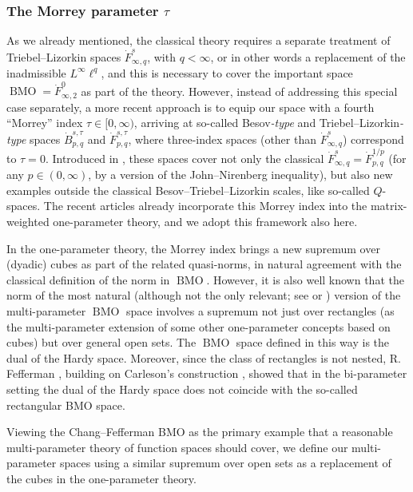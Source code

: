 \documentclass[11pt, reqno]{amsart}
\theoremstyle{definition}
\theoremstyle{remark}
\numberwithin{equation}{section}
\newcommand{\BMO}{\operatorname{BMO}}
\begin{document}
\subsubsection*{The Morrey parameter $\tau$}
As we already mentioned, the classical theory requires a separate treatment of Triebel--Lizorkin spaces $\dot F^s_{\infty,q}$, with $q<\infty$, or in other words a replacement of the inadmissible $L^\infty\ell^q$, and this is necessary to cover the important space $\BMO=\dot F^0_{\infty,2}$ as part of the theory. However, instead of addressing this special case separately, a more recent approach is to equip our space with a fourth ``Morrey'' index $\tau\in[0,\infty)$, arriving at so-called Besov{\em-type} and Triebel--Lizorkin{\em-type} spaces $\dot B^{s,\tau}_{p,q}$ and $\dot F^{s,\tau}_{p,q}$, where three-index spaces (other than $\dot F^s_{\infty,q}$) correspond to $\tau=0$. Introduced in \cite{YY08,YY10,YSY10}, these spaces cover not only the classical $\dot F^s_{\infty,q}=\dot F^{1/p}_{p,q}$ (for any $p\in(0,\infty)$, by a version of the John--Nirenberg inequality), but also new examples outside the classical Besov--Triebel--Lizorkin scales, like so-called $Q$-spaces. The recent articles \cite{BHYY:1a,BHYY:1b,BHYY:1c} already incorporate this Morrey index into the matrix-weighted one-parameter
theory, and we adopt this framework also here.

In the one-parameter theory, the Morrey index brings a new supremum over (dyadic) cubes as part of the related quasi-norms, in natural agreement with the classical
definition of the norm in $\BMO$. However, it is also well known that the norm of the most natural
\cite{CF80,CF85} (although not the only relevant; see \cite[p.\,1708]{HPW18} or \cite[Definitions 1.3--1.4]{DKPS:bmo}) version of the multi-parameter $\BMO$ space involves a supremum not just over rectangles (as the multi-parameter extension of some other one-parameter concepts based on cubes) but over general open sets.
The $\BMO$ space defined in this way is the dual of the Hardy space.
Moreover, since the class of rectangles is not nested,
R. Fefferman \cite{Fef79}, building on Carleson's construction \cite{Car},
showed that in the bi-parameter setting the dual of the Hardy space
does not coincide with the so-called rectangular BMO space.

Viewing the Chang--Fefferman BMO as the primary example that a reasonable multi-parameter theory of function spaces should cover, we define our multi-parameter spaces using a similar supremum over open sets as a replacement of the cubes in the one-parameter theory.
\end{document}

